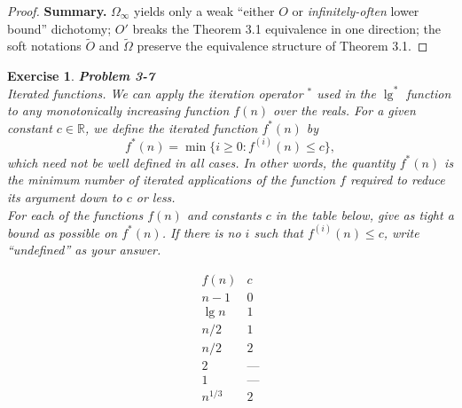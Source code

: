 \documentclass[12pt]{article}
\newtheorem{exercise}[theorem]{Exercise}
\theoremstyle{definition}
\begin{document}
\begin{proof}
\medskip
\noindent\textbf{Summary.} 
$\Omega_\infty$ yields only a weak “either $O$ or \emph{infinitely-often} lower bound” dichotomy; $O'$ breaks the Theorem 3.1 equivalence in one direction; the soft notations $\tilde{O}$ and $\tilde{\Omega}$ preserve the equivalence structure of Theorem 3.1.
\end{proof}

\newpage
\begin{exercise}
\noindent
\textbf{Problem 3-7} \\
Iterated functions. We can apply the iteration operator $^{*}$ used in the $\lg^{*}$ function to any monotonically increasing function $f(n)$ over the reals. For a given constant $c \in \mathbb{R}$, we define the iterated function $f^{*}(n)$ by
\[
f^{*}(n) = \min \{ i \ge 0 : f^{(i)}(n) \le c \},
\]
which need not be well defined in all cases. In other words, the quantity $f^{*}(n)$ is the minimum number of iterated applications of the function $f$ required to reduce its argument down to $c$ or less. \\

For each of the functions $f(n)$ and constants $c$ in the table below, give as tight a bound as possible on $f^{*}(n)$. If there is no $i$ such that $f^{(i)}(n)\le c$, write “undefined” as your answer.

\[
\begin{array}{c|c}
f(n) & c \\
\hline
n-1 & 0 \\
\lg n & 1 \\
n/2 & 1 \\
n/2 & 2 \\
2 & \text{---} \\
1 & \text{---} \\
n^{1/3} & 2 \\
\end{array}
\]
\end{exercise}
\end{document}
